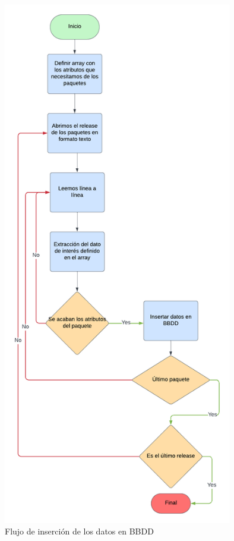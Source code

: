 \documentclass[a4paper, 12pt]{book}
\begin{document}
\begin{figure}
	\centering
	\includegraphics[width=10cm, keepaspectratio]{img/Insertar BBDD.png}
	\caption{Flujo de inserción de los datos en BBDD}
	\label{fig:flujo insertar datos}
\end{figure}
\end{document}
